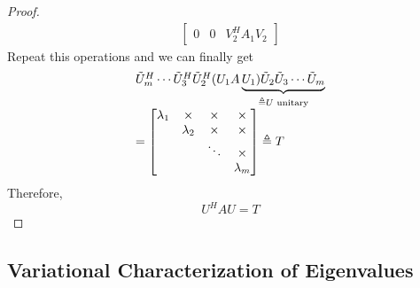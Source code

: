 \begin{multicols}{2}
\begin{proof}
\[\begin{array}{ll}
\begin{bmatrix}
            0         & 0         & V_2^HA_1V_2
        \end{bmatrix}
        \end{array}
    \]
    Repeat this operations and we can finally get 
    \[
        \begin{array}{l}
        \tilde{U}_m^H\cdots\tilde{U}_3^H\tilde{U}_2^H(U_1A \underbrace{U_1)\tilde{U}_2\tilde{U}_3\cdots\tilde{U}_m}_{\triangleq U \text{ \rm unitary}} \\
        = \begin{bmatrix}
            \lambda_1   & \times    & \times    & \times    \\
                        & \lambda_2 & \times    & \times    \\
                        &           & \ddots    & \times    \\
                        &           &           & \lambda_m
        \end{bmatrix}\triangleq T
        \end{array}
    \]
    Therefore,
    \[
        U^HAU = T
    \]
\end{proof}
\subsection{Variational Characterization of Eigenvalues}

\end{multicols}
